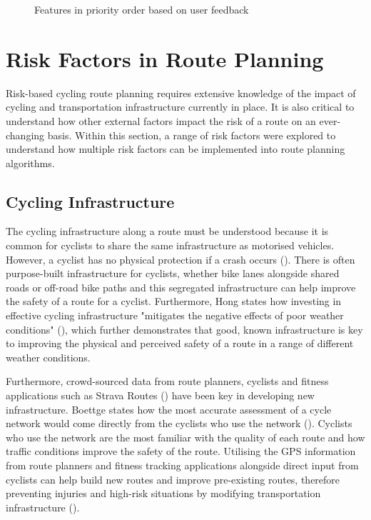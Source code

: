 \begin{figure}[h!]
    \centering
    \caption{Features in priority order based on user feedback}
    \label{fig:features}
\end{figure}

\section{Risk Factors in Route Planning}
Risk-based cycling route planning requires extensive knowledge of the impact of cycling and transportation infrastructure currently in place. It is also critical to understand how other external factors impact the risk of a route on an ever-changing basis. Within this section, a range of risk factors were explored to understand how multiple risk factors can be implemented into route planning algorithms.

\subsection{Cycling Infrastructure}
\label{litrev:cyclinginfrastructure}
The cycling infrastructure along a route must be understood because it is common for cyclists to share the same infrastructure as motorised vehicles. However, a cyclist has no physical protection if a crash occurs (\cite{reynolds_impact_2009}). There is often purpose-built infrastructure for cyclists, whether bike lanes alongside shared roads or off-road bike paths and this segregated infrastructure can help improve the safety of a route for a cyclist. Furthermore, Hong states how investing in effective cycling infrastructure "mitigates the negative effects of poor weather conditions" (\cite{hong_can_2020}), which further demonstrates that good, known infrastructure is key to improving the physical and perceived safety of a route in a range of different weather conditions. 

Furthermore, crowd-sourced data from route planners, cyclists and fitness applications such as Strava Routes (\cite{noauthor_strava_nodate}) have been key in developing new infrastructure. Boettge states how the most accurate assessment of a cycle network would come directly from the cyclists who use the network (\cite{boettge_assessing_2017}). Cyclists who use the network are the most familiar with the quality of each route and how traffic conditions improve the safety of the route. Utilising the GPS information from route planners and fitness tracking applications alongside direct input from cyclists can help build new routes and improve pre-existing routes, therefore preventing injuries and high-risk situations by modifying transportation infrastructure (\cite{reynolds_impact_2009}).

